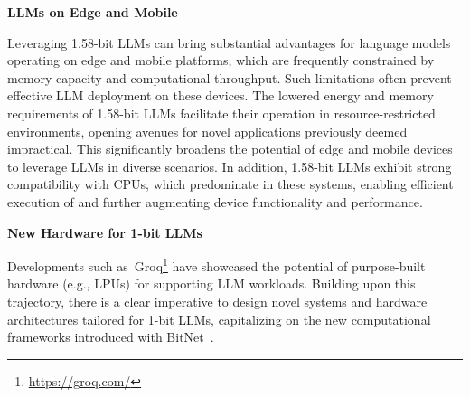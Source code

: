 \textbf{LLMs on Edge and Mobile}

Leveraging 1.58-bit LLMs can bring substantial advantages for language models operating on edge and mobile platforms, which are frequently constrained by memory capacity and computational throughput. Such limitations often prevent effective LLM deployment on these devices. The lowered energy and memory requirements of 1.58-bit LLMs facilitate their operation in resource-restricted environments, opening avenues for novel applications previously deemed impractical. This significantly broadens the potential of edge and mobile devices to leverage LLMs in diverse scenarios. In addition, 1.58-bit LLMs exhibit strong compatibility with CPUs, which predominate in these systems, enabling efficient execution of  and further augmenting device functionality and performance.

\textbf{New Hardware for 1-bit LLMs}

Developments such as~Groq\footnote{\url{https://groq.com/}} have showcased the potential of purpose-built hardware (e.g., LPUs) for supporting LLM workloads. Building upon this trajectory, there is a clear imperative to design novel systems and hardware architectures tailored for 1-bit LLMs, capitalizing on the new computational frameworks introduced with BitNet~\cite{bitnet}.